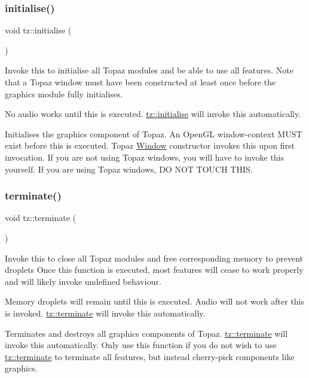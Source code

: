 \subsubsection{\texorpdfstring{initialise()}{initialise()}}
{\footnotesize\ttfamily void tz\+::initialise (\begin{DoxyParamCaption}{ }\end{DoxyParamCaption})\hspace{0.3cm}{\ttfamily [inline]}}

Invoke this to initialise all Topaz modules and be able to use all features. Note that a Topaz window must have been constructed at least once before the graphics module fully initialises.

No audio works until this is executed. \mbox{\hyperlink{namespacetz_aeb2530fee0e452e5ba5f4d0d0ebaa797}{tz\+::initialise}} will invoke this automatically.

Initialises the graphics component of Topaz. An Open\+GL window-\/context M\+U\+ST exist before this is executed. Topaz \mbox{\hyperlink{class_window}{Window}} constructor invokes this upon first invocation. If you are not using Topaz windows, you will have to invoke this yourself. If you are using Topaz windows, DO N\+OT T\+O\+U\+CH T\+H\+IS. \mbox{\label{namespacetz_a0a5d1e375e7e82fcd12a8b74b8012bae}} 
\subsubsection{\texorpdfstring{terminate()}{terminate()}}
{\footnotesize\ttfamily void tz\+::terminate (\begin{DoxyParamCaption}{ }\end{DoxyParamCaption})\hspace{0.3cm}{\ttfamily [inline]}}

Invoke this to close all Topaz modules and free corresponding memory to prevent droplets Once this function is executed, most features will cease to work properly and will likely invoke undefined behaviour.

Memory droplets will remain until this is executed. Audio will not work after this is invoked. \mbox{\hyperlink{namespacetz_a0a5d1e375e7e82fcd12a8b74b8012bae}{tz\+::terminate}} will invoke this automatically.

Terminates and destroys all graphics components of Topaz. \mbox{\hyperlink{namespacetz_a0a5d1e375e7e82fcd12a8b74b8012bae}{tz\+::terminate}} will invoke this automatically. Only use this function if you do not wish to use \mbox{\hyperlink{namespacetz_a0a5d1e375e7e82fcd12a8b74b8012bae}{tz\+::terminate}} to terminate all features, but instead cherry-\/pick components like graphics. 